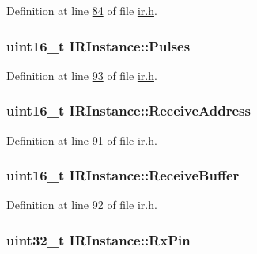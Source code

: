 Definition at line \hyperlink{ir_8h_source_l00084}{84} of file \hyperlink{ir_8h_source}{ir.\-h}.

\hypertarget{struct_i_r_instance_a374091556baaf95cb29a195e877efc1c}{
\subsubsection[{Pulses}]{\setlength{\rightskip}{0pt plus 5cm}uint16\-\_\-t I\-R\-Instance\-::\-Pulses}}\label{struct_i_r_instance_a374091556baaf95cb29a195e877efc1c}


Definition at line \hyperlink{ir_8h_source_l00093}{93} of file \hyperlink{ir_8h_source}{ir.\-h}.

\hypertarget{struct_i_r_instance_a76f9d50da2a9a8c4e4ee3f61e2296514}{
\subsubsection[{Receive\-Address}]{\setlength{\rightskip}{0pt plus 5cm}uint16\-\_\-t I\-R\-Instance\-::\-Receive\-Address}}\label{struct_i_r_instance_a76f9d50da2a9a8c4e4ee3f61e2296514}


Definition at line \hyperlink{ir_8h_source_l00091}{91} of file \hyperlink{ir_8h_source}{ir.\-h}.

\hypertarget{struct_i_r_instance_aba9722c0b3b4643583f06d05d23bc54d}{
\subsubsection[{Receive\-Buffer}]{\setlength{\rightskip}{0pt plus 5cm}uint16\-\_\-t I\-R\-Instance\-::\-Receive\-Buffer}}\label{struct_i_r_instance_aba9722c0b3b4643583f06d05d23bc54d}


Definition at line \hyperlink{ir_8h_source_l00092}{92} of file \hyperlink{ir_8h_source}{ir.\-h}.

\hypertarget{struct_i_r_instance_ab9fd2a831b0252be9553645df9250c54}{
\subsubsection[{Rx\-Pin}]{\setlength{\rightskip}{0pt plus 5cm}uint32\-\_\-t I\-R\-Instance\-::\-Rx\-Pin}}\label{struct_i_r_instance_ab9fd2a831b0252be9553645df9250c54}


